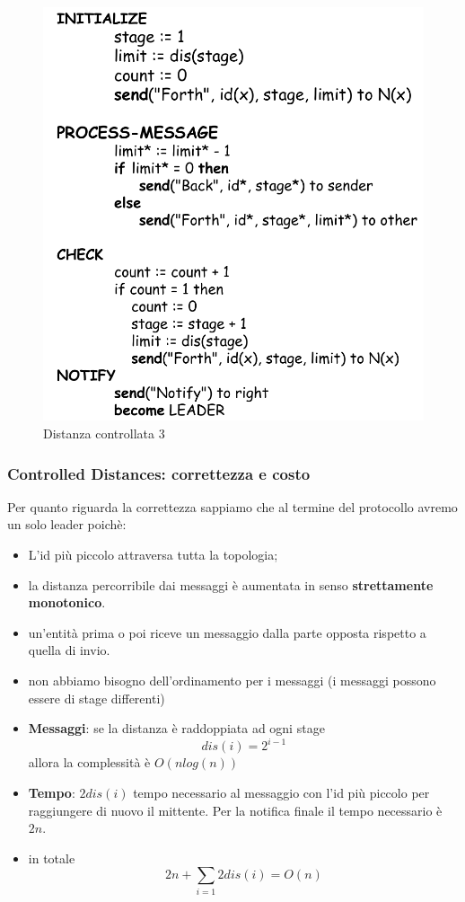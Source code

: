 \documentclass[12pt]{article}
\begin{document}
			\begin{figure}[h!]
				\centering
				\includegraphics[scale=0.30]{img/con3.png}
				\caption{Distanza controllata 3}
			\end{figure}
			
		\subsubsection{Controlled Distances: correttezza e costo}
			Per quanto riguarda la correttezza sappiamo che al termine del protocollo avremo un solo leader poichè:
			\begin{itemize}
				\item L'id più piccolo attraversa tutta la topologia;
				\item la distanza percorribile dai messaggi è aumentata in senso \textbf{strettamente monotonico}.
				\item un'entità prima o poi riceve un messaggio dalla parte opposta rispetto a quella di invio. 
				\item non abbiamo bisogno dell'ordinamento per i messaggi (i messaggi possono essere di stage differenti)
			\end{itemize}
			\begin{itemize}
				\item \textbf{Messaggi}: se la distanza è raddoppiata ad ogni stage $$dis(i) =2^{i-1}$$ allora la complessità è $O(nlog(n))$
				\item \textbf{Tempo}: $2dis(i)$ tempo necessario al messaggio con l'id più piccolo per raggiungere di nuovo il mittente. Per la notifica finale il tempo necessario è $2n$.
				\item in totale $$2n+\sum_{i=1}2dis(i) = O(n) $$ 
			\end{itemize}
		
\end{document}
